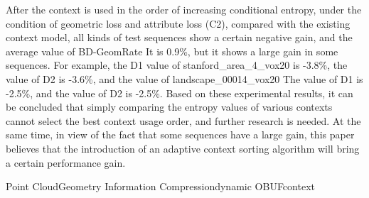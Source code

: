 \begin{eabstract}
    After the context is used in the order of increasing conditional entropy, under the condition of geometric loss and attribute loss (C2), compared with the existing context model, all kinds of test sequences show a certain negative gain, and the average value of BD-GeomRate It is 0.9\%, but it shows a large gain in some sequences. For example, the D1 value of stanford\_area\_4\_vox20 is -3.8\%, the value of D2 is -3.6\%, and the value of landscape\_00014\_vox20 The value of D1 is -2.5\%, and the value of D2 is -2.5\%. Based on these experimental results, it can be concluded that simply comparing the entropy values of various contexts cannot select the best context usage order, and further research is needed. At the same time, in view of the fact that some sequences have a large gain, this paper believes that the introduction of an adaptive context sorting algorithm will bring a certain performance gain.

\end{eabstract}

\begin{ekeywords}
    Point Cloud\quad Geometry Information Compression\quad dynamic OBUF\quad context
\end{ekeywords}


